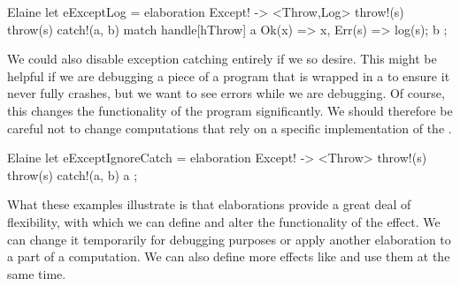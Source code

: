 \begin{lst}{Elaine}
let eExceptLog = elaboration Except! -> <Throw,Log> {
    throw!(s) { throw(s) }
    catch!(a, b) {
        match handle[hThrow] a {
            Ok(x) => x,
            Err(s) => {
                log(s);
                b
            }
        }
    }
};
\end{lst}
%
We could also disable exception catching entirely if we so desire. This might be helpful if we are debugging a piece of a program that is wrapped in a  to ensure it never fully crashes, but we want to see errors while we are debugging. Of course, this changes the functionality of the program significantly. We should therefore be careful not to change computations that rely on a specific implementation of the .

\begin{lst}{Elaine}
let eExceptIgnoreCatch = elaboration Except! -> <Throw> {
    throw!(s) { throw(s) }
    catch!(a, b) { a }
};
\end{lst}
%
What these examples illustrate is that elaborations provide a great deal of flexibility, with which we can define and alter the functionality of the  effect. We can change it temporarily for debugging purposes or apply another elaboration to a part of a computation. We can also define more effects like  and use them at the same time.
